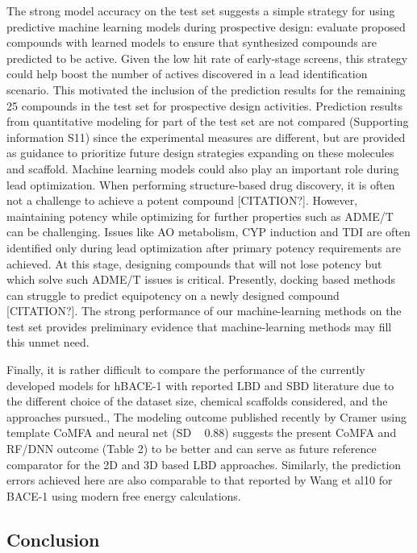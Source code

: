 The strong model accuracy on the test set suggests a simple strategy for using predictive machine learning models during prospective design:  evaluate proposed compounds with learned models to ensure that synthesized compounds are predicted to be active.  Given the low hit rate of early-stage screens, this strategy could help boost the number of actives discovered in a lead identification scenario.  This motivated the inclusion of the prediction results for the remaining 25 compounds in the test set for prospective design activities.  Prediction results from quantitative modeling for part of the test set are not compared (Supporting information S11) since the experimental measures are different, but are provided as guidance to prioritize future design strategies expanding on these molecules and scaffold.
Machine learning models could also play an important role during lead optimization. When performing structure-based drug discovery, it is often not a challenge to achieve a potent compound [CITATION?]. However, maintaining potency while optimizing for further properties such as ADME/T can be challenging. Issues like AO metabolism, CYP induction and TDI are often identified only during lead optimization after primary potency requirements are achieved. At this stage, designing compounds that will not lose potency but which solve such ADME/T issues is critical. Presently, docking based methods can struggle to predict equipotency on a newly designed compound [CITATION?]. The strong performance of our machine-learning methods on the test set provides preliminary evidence that machine-learning methods may fill this unmet need.  

Finally, it is rather difficult to compare the performance of the currently developed models for hBACE-1 with reported LBD and SBD literature due to the different choice of the dataset size, chemical scaffolds considered, and the approaches pursued.,  The modeling outcome published recently by Cramer using template CoMFA and neural net (SD ~ 0.88) suggests the present CoMFA and RF/DNN outcome (Table 2) to be better and can serve as future reference comparator for the 2D and 3D based LBD approaches.  Similarly, the prediction errors achieved here are also comparable to that reported by Wang et al10 for BACE-1 using modern free energy calculations.

\subsection{Conclusion}

